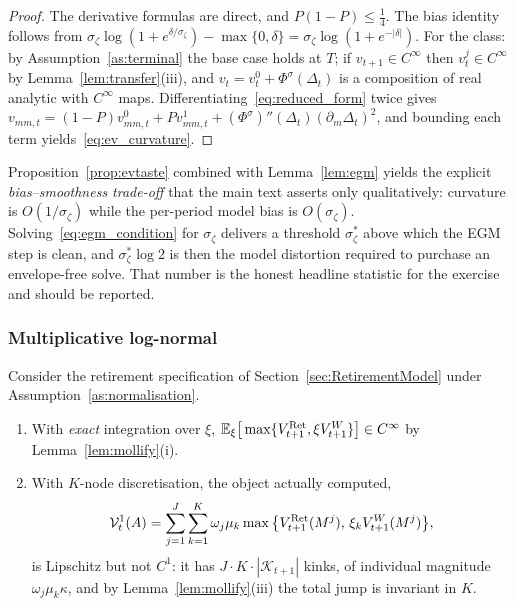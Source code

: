 \begin{proof}
The derivative formulas are direct, and $P(1-P)\le\tfrac14$. The bias identity follows
from $\sigma_\zeta\log(1+e^{\delta/\sigma_\zeta})-\max\{0,\delta\}
=\sigma_\zeta\log(1+e^{-|\delta|})$. For the class: by
Assumption~\ref{as:terminal} the base case holds at $T$; if $v_{t+1}\in C^{\infty}$
then $v_t^{j}\in C^{\infty}$ by Lemma~\ref{lem:transfer}(iii), and
$v_t=v_t^{0}+\Phi^{\sigma}(\Delta_t)$ is a composition of real analytic with
$C^{\infty}$ maps. Differentiating~\eqref{eq:reduced_form} twice gives
$v_{mm,t}=(1-P)v_{mm,t}^{0}+Pv_{mm,t}^{1}+(\Phi^{\sigma})''(\Delta_t)(\partial_m\Delta_t)^{2}$,
and bounding each term yields~\eqref{eq:ev_curvature}.
\end{proof}

Proposition~\ref{prop:evtaste} combined with Lemma~\ref{lem:egm} yields the explicit
\emph{bias--smoothness trade-off} that the main text asserts only qualitatively:
curvature is $O(1/\sigma_\zeta)$ while the per-period model bias is
$O(\sigma_\zeta)$. Solving~\eqref{eq:egm_condition} for $\sigma_\zeta$
delivers a threshold $\sigma_\zeta^{\ast}$ above which the EGM step is clean, and
$\sigma_\zeta^{\ast}\log 2$ is then the model distortion required to purchase an
envelope-free solve. That number is the honest headline statistic for the exercise and
should be reported.

\subsubsection{Multiplicative log-normal}

\begin{proposition}
\label{prop:lognormaltaste}
Consider the retirement specification of Section~\ref{sec:RetirementModel} under
Assumption~\ref{as:normalisation}.
\begin{enumerate}
    \item With \emph{exact} integration over $\xi$,
    $\mathbb{E}_\xi\big[\max\{V_{t+1}^{\mathrm{Ret}},\xi V_{t+1}^{W}\}\big]\in C^{\infty}$ by
    Lemma~\ref{lem:mollify}(i).
    \item With $K$-node discretisation, the object actually computed,
    \begin{align}
    \mathcal{V}_t^{1}(A)=\sum_{j=1}^{J}\sum_{k=1}^{K}\omega_j\mu_k
    \max\big\{V_{t+1}^{\mathrm{Ret}}(M^{j}),\,\xi_k V_{t+1}^{W}(M^{j})\big\},
    \end{align}
    is Lipschitz but not $C^{1}$: it has $J\!\cdot\!K\!\cdot\!|\mathcal{K}_{t+1}|$ kinks,
    of individual magnitude $\omega_j\mu_k\kappa$, and by
    Lemma~\ref{lem:mollify}(iii) the total jump is invariant in $K$.
\end{enumerate}
\end{proposition}

